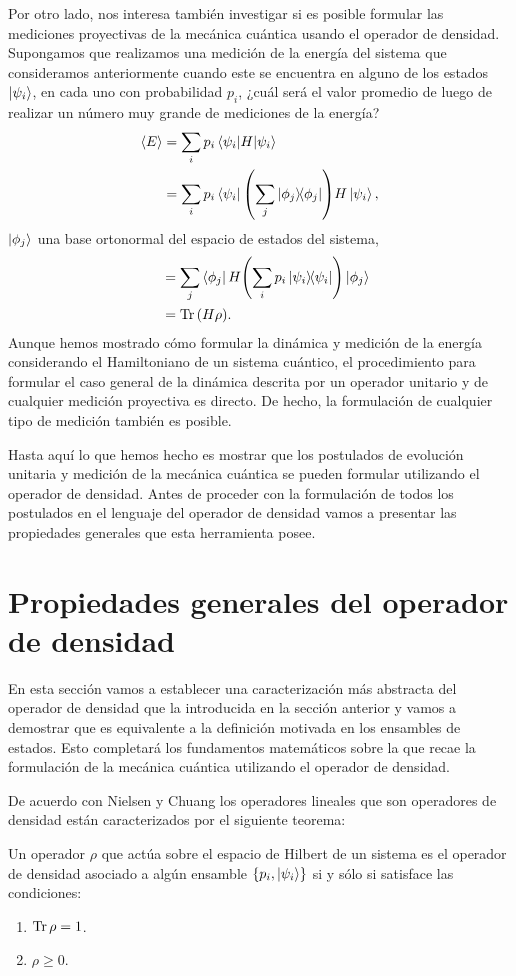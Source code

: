 Por otro lado, nos interesa también investigar si es posible formular
las mediciones proyectivas de la mecánica cuántica usando el operador de 
densidad. 
Supongamos que realizamos una medición de la energía del sistema que
consideramos anteriormente cuando este se encuentra en alguno de los 
estados $\ket{\psi_{i} }$, en cada uno con probabilidad $p_i$,
¿cuál será el valor promedio de luego de realizar un número
muy grande de mediciones de la energía?
\begin{align}
	\expval{E} &= \sum_i p_i\matrixel{\psii}{H}{\psii} \\
	&= \sum_i p_i\bra{\psii}\qty(\sum_j \dyad{\phi_j}{\phi_j})H\ket{\psii},
\end{align}
$\ket{\phi_j}$ una base ortonormal
 
del espacio de estados del sistema,
\begin{align}
	\hspace{3mm}&= \sum_j \bra{\phi_j}H\qty(\sum_i p_i \dyad{\psii}{\psii})\ket{\phi_j} \\
	&= \Tr \qty(H\rho).
\end{align}
Aunque hemos mostrado cómo formular la dinámica y medición de la 
energía considerando el Hamiltoniano de un sistema cuántico, 
el procedimiento para formular el caso general de la dinámica
descrita por un operador unitario y de cualquier medición 
proyectiva es directo. De hecho, la formulación de cualquier tipo
de medición también es posible. 

Hasta aquí lo que hemos hecho es mostrar que los postulados de 
evolución unitaria y medición de la mecánica cuántica 
se pueden formular utilizando el operador de densidad.
Antes de proceder con la formulación de todos los postulados en el 
lenguaje del operador de densidad vamos a presentar las propiedades 
generales que esta herramienta posee. 

\section{Propiedades generales del operador de densidad} %
En esta sección vamos a establecer una caracterización 
más abstracta del operador de densidad que la introducida en 
la sección anterior y vamos a demostrar que es equivalente 
a la definición motivada en los ensambles de estados. 
Esto completará los fundamentos matemáticos
sobre la que recae la formulación de la mecánica cuántica 
utilizando el operador de densidad. 

De acuerdo con Nielsen y Chuang \cite{nielsen_chuang_2011}
los operadores lineales que son operadores de densidad están 
caracterizados por el siguiente teorema:
\begin{teorema}
Un operador $\rho$  que actúa sobre el espacio de Hilbert de un sistema 
es el operador de densidad asociado a algún ensamble 
$\{p_i, \ket{\psi _i} \}$ si y sólo si satisface las condiciones:
\begin{enumerate}
\item $\Tr \rho = 1$.
\item $\rho \geq 0$.
\end{enumerate}	
\label{teo:density-operator}
\end{teorema}

